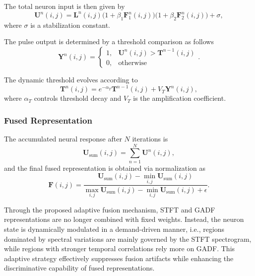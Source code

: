 \documentclass[journal]{IEEEtran}
\begin{document}
The total neuron input is then given by
\begin{equation}
	\boldsymbol{U}^n(i,j) = \boldsymbol{L}^n(i,j)\Big(1 + \beta_1 \boldsymbol{F}_1^n(i,j)\Big)
	\Big(1 + \beta_2 \boldsymbol{F}_2^n(i,j)\Big) + \sigma,
	\label{eq:internal_activity}
\end{equation}
where $\sigma$ is a stabilization constant.

The pulse output is determined by a threshold comparison as follows
\begin{equation}
	\boldsymbol{Y}^n(i,j) =
	\begin{cases}
		1, & \boldsymbol{U}^n(i,j) > \boldsymbol{T}^{n-1}(i,j) \\
		0, & \text{otherwise}
	\end{cases}.
	\label{eq:pulse_output}
\end{equation}

The dynamic threshold evolves according to
\begin{equation}
	\boldsymbol{T}^n(i,j) = e^{-\alpha_T} \boldsymbol{T}^{n-1}(i,j) + V_T \boldsymbol{Y}^n(i,j),
	\label{eq:threshold_update}
\end{equation}
where $\alpha_T$ controls threshold decay and $V_T$ is the amplification coefficient.

\subsubsection{Fused Representation}
The accumulated neural response after $N$ iterations is
\begin{equation}
	\boldsymbol{U}_{\mathrm{sum}}(i,j)=\sum_{n=1}^{N} \boldsymbol{U}^{n}(i,j),
\end{equation}
and the final fused representation is obtained via normalization as
\begin{equation}
	\boldsymbol{F}(i,j)=
	\frac{\boldsymbol{U}_{\mathrm{sum}}(i,j)-\min\limits_{i,j} \boldsymbol{U}_{\mathrm{sum}}(i,j)}
	{\max\limits_{i,j} \boldsymbol{U}_{\mathrm{sum}}(i,j)-\min\limits_{i,j} \boldsymbol{U}_{\mathrm{sum}}(i,j)+\epsilon}.
\end{equation}

Through the proposed adaptive fusion mechanism, STFT and GADF representations are no longer combined with fixed weights. Instead, the neuron state is dynamically modulated in a demand-driven manner, i.e., regions dominated by spectral variations are mainly governed by the STFT spectrogram, while regions with stronger temporal correlations rely more on GADF. This adaptive strategy effectively suppresses fusion artifacts while enhancing the discriminative capability of fused representations.
\end{document}

